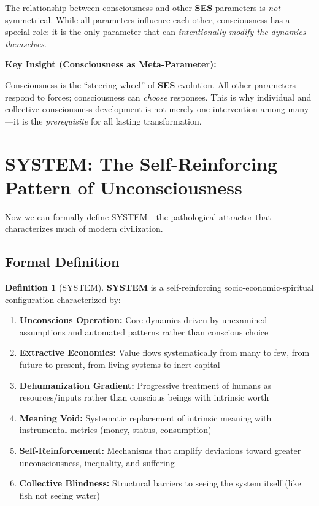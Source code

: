 \documentclass[11pt,a4paper]{article}
\newcommand{\SES}{\textbf{SES}}
\theoremstyle{definition}
\newtheorem{definition}{Definition}[section]
\theoremstyle{remark}
\newenvironment{keyinsight}[1]
{
    \begin{mdframed}[backgroundcolor=hopegreen!10,linecolor=hopegreen,linewidth=2pt]
    \textbf{Key Insight (#1):}
}
{
    \end{mdframed}
}
\begin{document}
The relationship between consciousness and other \SES{} parameters is \textit{not} symmetrical. While all parameters influence each other, consciousness has a special role: it is the only parameter that can \textit{intentionally modify the dynamics themselves}.

\begin{keyinsight}{Consciousness as Meta-Parameter}
Consciousness is the ``steering wheel'' of \SES{} evolution. All other parameters respond to forces; consciousness can \textit{choose} responses. This is why individual and collective consciousness development is not merely one intervention among many---it is the \textit{prerequisite} for all lasting transformation.
\end{keyinsight}


\section{SYSTEM: The Self-Reinforcing Pattern of Unconsciousness}

Now we can formally define SYSTEM---the pathological attractor that characterizes much of modern civilization.

\subsection{Formal Definition}

\begin{definition}[SYSTEM]\label{def:system}
\textbf{SYSTEM} is a self-reinforcing socio-economic-spiritual configuration characterized by:

\begin{enumerate}
    \item \textbf{Unconscious Operation:} Core dynamics driven by unexamined assumptions and automated patterns rather than conscious choice
    
    \item \textbf{Extractive Economics:} Value flows systematically from many to few, from future to present, from living systems to inert capital
    
    \item \textbf{Dehumanization Gradient:} Progressive treatment of humans as resources/inputs rather than conscious beings with intrinsic worth
    
    \item \textbf{Meaning Void:} Systematic replacement of intrinsic meaning with instrumental metrics (money, status, consumption)
    
    \item \textbf{Self-Reinforcement:} Mechanisms that amplify deviations toward greater unconsciousness, inequality, and suffering
    
    \item \textbf{Collective Blindness:} Structural barriers to seeing the system itself (like fish not seeing water)
\end{enumerate}
\end{definition}
\end{document}
